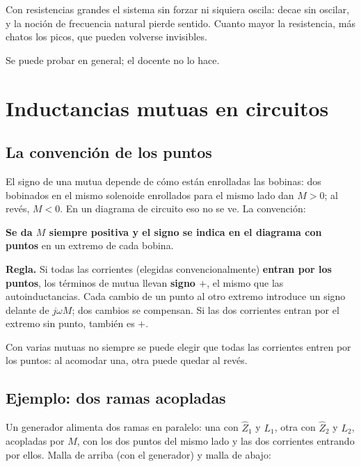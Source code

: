 \documentclass[12pt,a4paper]{article}
\begin{document}
\begin{notebox}
Con resistencias grandes el sistema sin
forzar ni siquiera oscila: decae sin oscilar, y la noción de frecuencia
natural pierde sentido. Cuanto mayor la resistencia, más chatos los picos,
que pueden volverse invisibles.
\end{notebox}

Se puede probar en general; el docente no lo hace.

\section{Inductancias mutuas en circuitos}

\subsection{La convención de los puntos}

El signo de una mutua depende de cómo están enrolladas las bobinas: dos
bobinados en el mismo solenoide enrollados para el mismo lado dan $M>0$; al
revés, $M<0$. En un diagrama de circuito eso no se ve. La convención:

\begin{notebox}
\textbf{Se da $M$ siempre positiva y el signo se indica en el diagrama con puntos}
en un extremo de cada bobina.
\end{notebox}

\textbf{Regla.} Si todas las corrientes (elegidas convencionalmente) \textbf{entran por
los puntos}, los términos de mutua llevan \textbf{signo $+$}, el mismo que las
autoinductancias. Cada cambio de un punto al otro extremo introduce un signo
delante de $j\omega M$; dos cambios se compensan. Si las dos corrientes entran
por el extremo sin punto, también es $+$.

\begin{notebox}
Con varias mutuas no siempre se puede elegir que todas las corrientes entren
por los puntos: al acomodar una, otra puede quedar al revés.
\end{notebox}

\subsection{Ejemplo: dos ramas acopladas}

Un generador alimenta dos ramas en paralelo: una con $\hat Z_1$ y $L_1$, otra con
$\hat Z_2$ y $L_2$, acopladas por $M$, con los dos puntos del mismo lado y las
dos corrientes entrando por ellos. Malla de arriba (con el generador) y malla
de abajo:
\end{document}
